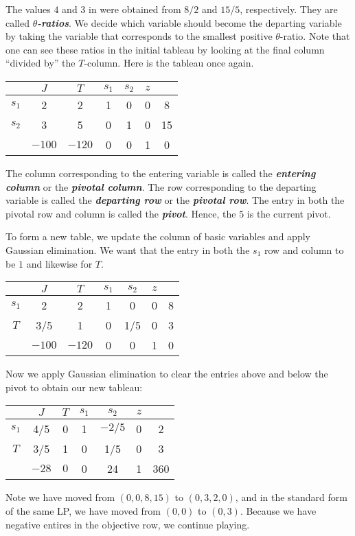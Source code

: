 \documentclass[a4paper, 12pt]{article}
\numberwithin{equation}{section}
\numberwithin{figure}{section}
\theoremstyle{definition}
\newcommand{\define}[1]{\textbf{\textit{#1}}}
\begin{document}
The values $4$ and $3$ in  were obtained from $8/2$ and
$15/5$, respectively. They are called \define{$\theta$-ratios}. We decide which
variable should become the departing variable by taking the variable that
corresponds to the smallest positive $\theta$-ratio. Note that one can see these
ratios in the initial tableau by looking at the final column ``divided by'' the
$T$-column. Here is the tableau once again.
\begin{center}
	\begin{tabular}{|c|ccccc|c|}
		\hline
		& $J$ & $T$ & $s_1$ & $s_2$ & $z$ & \\ \hline
		$s_1$ & 2 & 2 & 1 & 0 & 0 & 8 \\ \hline
		$s_2$ & 3 & 5 & 0 & 1 & 0 & 15 \\ \hline 
		& $-100$ & $-120$ & 0 & 0 & 1 & 0 \\ \hline
	\end{tabular}
\end{center}

The column corresponding to the entering variable is called the \define{entering
column} or the \define{pivotal column}. The row corresponding to the departing
variable is called the \define{departing row} or the \define{pivotal row}. The
entry in both the pivotal row and column is called the \define{pivot}. Hence,
the $5$ is the current pivot.

To form a new table, we update the column of basic variables and apply Gaussian
elimination. We want that the entry in both the $s_1$ row and column to be $1$
and likewise for $T$.
\begin{center}
	\begin{tabular}{|c|ccccc|c|}
		\hline
		& $J$ & $T$ & $s_1$ & $s_2$ & $z$ & \\ \hline
		$s_1$ & 2 & 2 & 1 & 0 & 0 & 8 \\ \hline
		$T$ & 3/5 & 1 & 0 & 1/5 & 0 & 3 \\ \hline 
		& $-100$ & $-120$ & 0 & 0 & 1 & 0 \\ \hline
	\end{tabular}
\end{center}
Now we apply Gaussian elimination to clear the entries above and below the
pivot to obtain our new tableau:
\begin{center}
	\begin{tabular}{|c|ccccc|c|}
		\hline
		& $J$ & $T$ & $s_1$ & $s_2$ & $z$ & \\ \hline
		$s_1$ & 4/5 & 0 & 1 & $-2/5$ & 0 & 2 \\ \hline
		$T$ & 3/5 & 1 & 0 & 1/5 & 0 & 3 \\ \hline 
		& $-28$ & $0$ & 0 & 24 & 1 & 360 \\ \hline
	\end{tabular}
\end{center}
Note we have moved from $(0,0,8,15)$ to $(0,3,2,0)$, and in the standard form of
the same LP, we have moved from $(0,0)$ to $(0,3)$. Because we have negative
entires in the objective row, we continue playing. 
\end{document}
